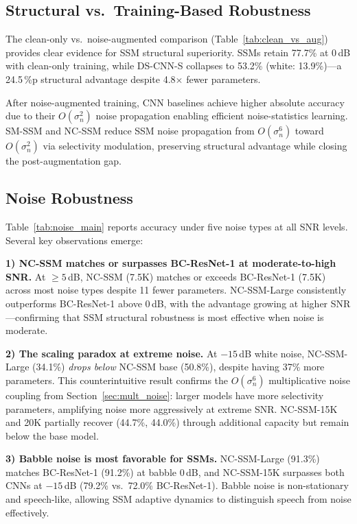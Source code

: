 \documentclass[journal]{IEEEtran}
\begin{document}
\subsection{Structural vs.\ Training-Based Robustness}
\label{sec:struct_vs_train}

The clean-only vs.\ noise-augmented comparison (Table~\ref{tab:clean_vs_aug}) provides clear evidence for SSM structural superiority.
SSMs retain 77.7\% at 0\,dB with clean-only training, while DS-CNN-S collapses to 53.2\% (white: 13.9\%)---a 24.5\,\%p structural advantage despite 4.8$\times$ fewer parameters.

After noise-augmented training, CNN baselines achieve higher absolute accuracy due to their $O(\sigma_n^2)$ noise propagation enabling efficient noise-statistics learning.
SM-SSM and NC-SSM reduce SSM noise propagation from $O(\sigma_n^6)$ toward $O(\sigma_n^2)$ via selectivity modulation, preserving structural advantage while closing the post-augmentation gap.


\subsection{Noise Robustness}

Table~\ref{tab:noise_main} reports accuracy under five noise types at all SNR levels.
Several key observations emerge:

\smallskip\noindent\textbf{1) NC-SSM matches or surpasses BC-ResNet-1 at moderate-to-high SNR.}
At $\geq 5$\,dB, NC-SSM (7.5K) matches or exceeds BC-ResNet-1 (7.5K) across most noise types despite 11 fewer parameters.
NC-SSM-Large consistently outperforms BC-ResNet-1 above 0\,dB, with the advantage growing at higher SNR---confirming that SSM structural robustness is most effective when noise is moderate.

\smallskip\noindent\textbf{2) The scaling paradox at extreme noise.}
At $-15$\,dB white noise, NC-SSM-Large (34.1\%) \emph{drops below} NC-SSM base (50.8\%), despite having 37\% more parameters.
This counterintuitive result confirms the $O(\sigma_n^6)$ multiplicative noise coupling from Section~\ref{sec:mult_noise}: larger models have more selectivity parameters, amplifying noise more aggressively at extreme SNR.
NC-SSM-15K and 20K partially recover (44.7\%, 44.0\%) through additional capacity but remain below the base model.

\smallskip\noindent\textbf{3) Babble noise is most favorable for SSMs.}
NC-SSM-Large (91.3\%) matches BC-ResNet-1 (91.2\%) at babble 0\,dB, and NC-SSM-15K surpasses both CNNs at $-15$\,dB (79.2\% vs.\ 72.0\% BC-ResNet-1).
Babble noise is non-stationary and speech-like, allowing SSM adaptive dynamics to distinguish speech from noise effectively.
\end{document}

